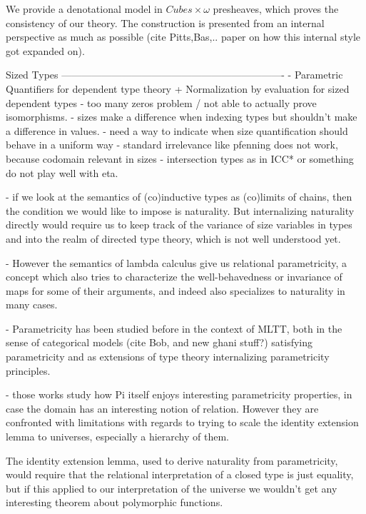 \documentclass{article}
\begin{document}
     We provide a denotational model in $Cubes \times \omega$
     presheaves, which proves the consistency of our theory. The construction is presented from an internal
     perspective as much as possible (cite Pitts,Bas,.. paper on how this internal style got expanded on).

  Sized Types   
  -------------------------------------------------------------------
  - Parametric Quantifiers for dependent type theory + Normalization by evaluation for sized dependent types
    - too many zeros problem / not able to actually prove isomorphisms.
    - sizes make a difference when indexing types but shouldn't make a difference in values.
    - need a way to indicate when size quantification should behave in a uniform way
      - standard irrelevance like pfenning does not work, because codomain relevant in sizes
      - intersection types as in ICC* or something do not play well with eta.
      
    - if we look at the semantics of (co)inductive types as (co)limits
    of chains, then the condition we would like to impose is
    naturality. But internalizing naturality directly would require us
    to keep track of the variance of size variables in types and into
    the realm of directed type theory, which is not well understood
    yet.
    
    - However the semantics of lambda calculus give us relational
    parametricity, a concept which also tries to characterize the
    well-behavedness or invariance of maps for some of their
    arguments, and indeed also specializes to naturality in many cases.

    - Parametricity has been studied before in the context of MLTT,
    both in the sense of categorical models (cite Bob, and new ghani
    stuff?) satisfying parametricity and as extensions of type theory
    internalizing parametricity principles.

    - those works study how Pi itself enjoys interesting parametricity
    properties, in case the domain has an interesting notion of
    relation. However they are confronted with limitations with
    regards to trying to scale the identity extension lemma to
    universes, especially a hierarchy of them.

    The identity extension lemma, used to derive naturality from
    parametricity, would require that the relational interpretation of
    a closed type is just equality, but if this applied to our
    interpretation of the universe we wouldn't get any interesting
    theorem about polymorphic functions.
\end{document}
